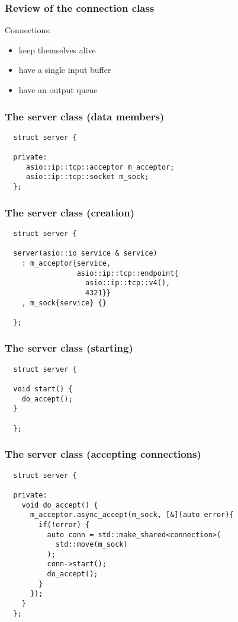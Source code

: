 \begin{frame}
  \frametitle{Review of the connection class}
  Connections:\pause{}
  \begin{itemize}
    \item{keep themselves alive}\pause{}
    \item{have a single input buffer}\pause{}
    \item{have an output queue}
  \end{itemize}
\end{frame}

\begin{frame}[fragile]
  \frametitle{The server class (data members)}
  \begin{verbatim}
  struct server {

  private:
     asio::ip::tcp::acceptor m_acceptor;
     asio::ip::tcp::socket m_sock;
  };
  \end{verbatim}
\end{frame}

\begin{frame}[fragile]
  \frametitle{The server class (creation)}
  \begin{verbatim}
  struct server {

  server(asio::io_service & service)
    : m_acceptor{service,
                 asio::ip::tcp::endpoint{
                   asio::ip::tcp::v4(),
                   4321}}
    , m_sock{service} {}

  };
  \end{verbatim}
\end{frame}

\begin{frame}[fragile]
  \frametitle{The server class (starting)}
  \begin{verbatim}
  struct server {

  void start() {
    do_accept();
  }

  };
  \end{verbatim}
\end{frame}

\begin{frame}[fragile]
  \frametitle{The server class (accepting connections)}
  \begin{verbatim}
  struct server {

  private:
    void do_accept() {
      m_acceptor.async_accept(m_sock, [&](auto error){
        if(!error) {
          auto conn = std::make_shared<connection>(
            std::move(m_sock)
          );
          conn->start();
          do_accept();
        }
      });
    }
  };
  \end{verbatim}
\end{frame}

